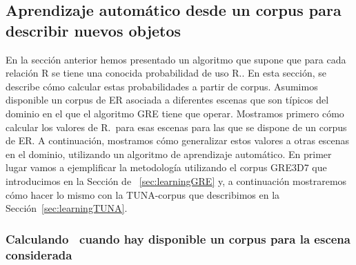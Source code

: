\subsection{Aprendizaje autom\'atico desde un corpus para describir nuevos objetos}
\label{sec:learning}



En la secci\'on anterior hemos presentado un algoritmo que supone que para
cada relaci\'on R se tiene una conocida
probabilidad de uso R.\puse. En esta secci\'on, se describe c\'omo
calcular estas probabilidades a partir de corpus. Asumimos disponible un corpus de ER asociada a diferentes
escenas que son t\'{i}picos del dominio en el que el algoritmo GRE tiene que operar. Mostramos primero c\'omo calcular los valores de R.\puse\ para
esas escenas para las que se dispone de un corpus de ER. A continuaci\'on, mostramos c\'omo
generalizar estos valores a otras escenas en el dominio, utilizando un
algoritmo de aprendizaje autom\'atico. En primer lugar vamos a ejemplificar la
metodolog\'{i}a utilizando el corpus GRE3D7 que introducimos en la Secci\'on de
~\ref{sec:learningGRE} y, a continuaci\'on mostraremos c\'omo hacer lo mismo con
la TUNA-corpus que describimos en la Secci\'on~\ref{sec:learningTUNA}.


\subsubsection{Calculando \puse\ cuando hay disponible un corpus para la escena considerada}


